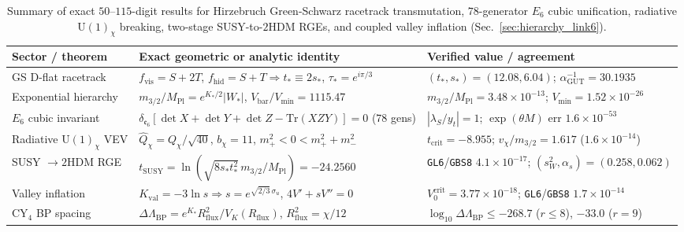 \documentclass[aps,prd,twocolumn,nofootinbib,floatfix]{revtex4-2}
\begin{document}
\begin{table}[t]
\caption{Summary of exact $50$--$115$-digit results for Hirzebruch Green-Schwarz racetrack transmutation, $78$-generator $E_6$ cubic unification, radiative $\mathrm{U}(1)_\chi$ breaking, two-stage SUSY-to-$2\mathrm{HDM}$ RGEs, and coupled valley inflation (Sec.~\ref{sec:hierarchy_link6}).}
\label{tab:hierarchy_link6}
\begin{ruledtabular}
\begin{tabular}{lll}
Sector / theorem & Exact geometric or analytic identity & Verified value / agreement \\
\hline
GS D-flat racetrack & $f_{\mathrm{vis}}=S+2T$, $f_{\mathrm{hid}}=S+T \Rightarrow t_* \equiv 2s_*$, $\tau_* = e^{i\pi/3}$ & $(t_*,s_*)=(12.08,6.04)$; $\alpha_{\mathrm{GUT}}^{-1}=30.1935$ \\
Exponential hierarchy & $m_{3/2}/M_{\mathrm{Pl}} = e^{K_*/2}|W_*|$, $V_{\mathrm{bar}}/V_{\min} = 1115.47$ & $m_{3/2}/M_{\mathrm{Pl}}=3.48\times 10^{-13}$; $V_{\min}=1.52\times 10^{-26}$ \\
$E_6$ cubic invariant & $\delta_{\mathfrak{e}_6}[\det X+\det Y+\det Z - \mathrm{Tr}(XZY)] = 0$ ($78$ gens) & $|\lambda_S/y_t|=1$; $\exp(\theta M)$ err $1.6\times 10^{-53}$ \\
Radiative $\mathrm{U}(1)_\chi$ VEV & $\hat{Q}_\chi = Q_\chi/\sqrt{40}$, $b_\chi=11$, $m_+^2 < 0 < m_+^2 + m_-^2$ & $t_{\mathrm{crit}}=-8.955$; $v_\chi/m_{3/2}=1.617$ ($1.6\times 10^{-14}$) \\
SUSY $\to 2\mathrm{HDM}$ RGE & $t_{\mathrm{SUSY}} = \ln(\sqrt{8s_* t_*^2}\,m_{3/2}/M_{\mathrm{Pl}}) = -24.2560$ & \texttt{GL6}/\texttt{GBS8} $4.1\times 10^{-17}$; $(s_W^2,\alpha_s)=(0.258,0.062)$ \\
Valley inflation & $K_{\mathrm{val}} = -3\ln s \Rightarrow s = e^{\sqrt{2/3}\,\sigma_u}$, $4V'+sV''=0$ & $V_0^{\mathrm{crit}}=3.77\times 10^{-18}$; \texttt{GL6}/\texttt{GBS8} $1.7\times 10^{-14}$ \\
CY$_4$ BP spacing & $\Delta\Lambda_{\mathrm{BP}} = e^{K_*}R_{\mathrm{flux}}^2 / V_K(R_{\mathrm{flux}})$, $R_{\mathrm{flux}}^2 = \chi/12$ & $\log_{10}\Delta\Lambda_{\mathrm{BP}} \le -268.7$ ($r \le 8$), $-33.0$ ($r=9$) \\
\end{tabular}
\end{ruledtabular}
\end{table}
\end{document}
